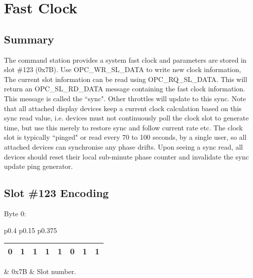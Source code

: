  

\chapter[Fast Clock]{Fast Clock}

\section{Summary}

The command station provides a system fast clock and parameters are stored in slot \#123 (0x7B). Use OPC\_WR\_SL\_DATA to write new clock information, The current slot information can be read using OPC\_RQ\_SL\_DATA. This will return an OPC\_SL\_RD\_DATA message containing the fast clock information. This message is called the ``sync". Other throttles will update to this sync. Note that all attached display devices keep a current clock calculation based on this sync read value, i.e. devices must not continuously poll the clock slot to generate time, but use this merely to restore sync and follow current rate etc. The clock slot is typically ``pinged" or read every 70 to 100 seconds, by a single user, so all attached devices can synchronise any phase drifts. Upon seeing a sync read, all devices should reset their local sub-minute phase counter and invalidate the sync update ping generator.

\section{Slot \#123 Encoding}

Byte 0:

\begin{tabular}{p{0.4\linewidth} p{0.15\linewidth} p{0.375\linewidth}} 

\begin{tabular}{|p{0.3cm}|p{0.3cm}|p{0.3cm}|p{0.3cm}|p{0.3cm}|p{0.3cm}|p{0.3cm}|p{0.3cm}|}
\hline
0 & 1 & 1 & 1 & 1 & 0 & 1 & 1\\
\hline
\end{tabular}
& 0x7B & Slot number.\\
\end{tabular}

